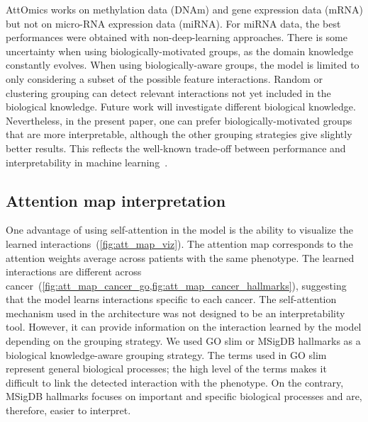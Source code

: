 \documentclass[../main.tex]{subfiles}
\begin{document}
		AttOmics works on methylation data (DNAm) and gene expression data (mRNA) but not on micro-RNA expression data (miRNA).
		For miRNA data, the best performances were obtained with non-deep-learning approaches.
		There is some uncertainty when using biologically-motivated groups, as the domain knowledge constantly evolves.
		When using biologically-aware groups, the model is limited to only considering a subset of the possible feature interactions.
		Random or clustering grouping can detect relevant interactions not yet included in the biological knowledge.
		Future work will investigate different biological knowledge.
		Nevertheless, in the present paper, one can prefer biologically-motivated groups that are more interpretable, although the other grouping strategies give slightly better results.
		This reflects the well-known trade-off between performance and interpretability in machine learning~\cite{Linardatos2021_ExplainableAI}.

	\subsection{Attention map interpretation}

		One advantage of using self-attention in the model is the ability to visualize the learned interactions~(\cref{fig:att_map_viz}).
		The attention map corresponds to the attention weights average across patients with the same phenotype.
		The learned interactions are different across cancer~(\cref{fig:att_map_cancer_go,fig:att_map_cancer_hallmarks}), suggesting that the model learns interactions specific to each cancer.
		The self-attention mechanism used in the architecture was not designed to be an interpretability tool.
		However, it can provide information on the interaction learned by the model depending on the grouping strategy.
		We used GO slim or MSigDB hallmarks as a biological knowledge-aware grouping strategy.
		The terms used in GO slim represent general biological processes; the high level of the terms makes it difficult to link the detected interaction with the phenotype.
		On the contrary, MSigDB hallmarks focuses on important and specific biological processes and  are, therefore, easier to interpret.
\end{document}
